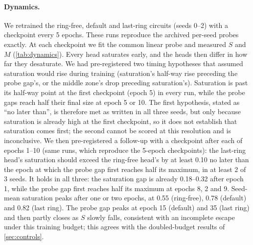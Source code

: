 \paragraph{Dynamics.} We retrained the ring-free, default and last-ring circuits (seeds 0--2) with a
checkpoint every 5 epochs. These runs reproduce the archived per-seed probes exactly. At each
checkpoint we fit the common linear probe and measured $S$ and $M$ (\cref{tab:dynamics}). Every head
saturates early, and the heads then differ in how far they desaturate. We had pre-registered two
timing hypotheses that assumed saturation would rise during training (saturation's half-way rise
preceding the probe gap's, or the middle zone's drop preceding saturation's). Saturation is past its half-way point at the first checkpoint (epoch 5) in every run, while the probe gaps reach half their final size at epoch 5 or 10. The first hypothesis, stated as ``no later than'', is therefore met as written in all three seeds, but only because saturation is already high at the first checkpoint, so it does not establish that saturation comes first; the second cannot be scored at this resolution and is inconclusive.
We then pre-registered a follow-up with a checkpoint after each of epochs 1--10 (same runs, which reproduce
the 5-epoch checkpoints): the last-ring head's saturation should exceed the ring-free head's by at
least 0.10 no later than the epoch at which the probe gap first reaches half its maximum, in at least 2
of 3 seeds. It holds in all three: the saturation gap is already 0.18--0.32 after epoch 1, while the
probe gap first reaches half its maximum at epochs 8, 2 and 9. Seed-mean saturation peaks after one or
two epochs, at 0.55 (ring-free), 0.78 (default) and 0.82 (last ring). The probe
gap peaks at epoch 15 (default) and 35 (last ring) and then partly closes as $S$ slowly falls, consistent with an incomplete escape under this training budget; this agrees with the doubled-budget results of \cref{sec:controls}.

